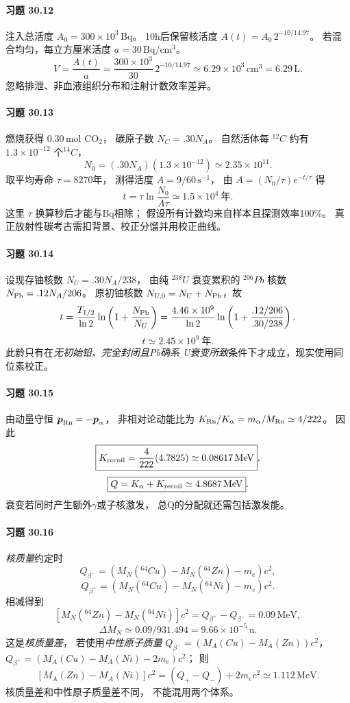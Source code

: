\paragraph{习题 30.12}
注入总活度 \(A_0=300\times10^3\,\mathrm{Bq}\)。
10h后保留核活度 \(A(t)=A_0\,2^{-10/14.97}\)。
若混合均匀，每立方厘米活度
\(a=30\,\mathrm{Bq/cm^3}\)。
\[
\boxed{V=\frac{A(t)}a
=\frac{300\times10^3}{30}\,2^{-10/14.97}
\simeq6.29\times10^3\,\mathrm{cm^3}
=6.29\,\mathrm L}.
\]
忽略排泄、非血液组织分布和注射计数效率差异。

\paragraph{习题 30.13}
燃烧获得 \(0.30\,\mathrm{mol}\) CO$_2$，
碳原子数 \(N_C=.30N_A\)。
自然活体每 \({}^{12}C\) 约有
\(1.3\times10^{-12}\) 个\({}^{14}C\)，
\[
N_0=(.30N_A)(1.3\times10^{-12})
\simeq2.35\times10^{11}.
\]
取平均寿命 \(\tau=8270\)年，
测得活度 \(A=9/60\,\mathrm{s^{-1}}\)，
由 \(A=(N_0/\tau)e^{-t/\tau}\) 得
\[
\boxed{t=\tau\ln\frac{N_0}{A\tau}
\simeq1.5\times10^4\ \text{年}}.
\]
这里 \(\tau\) 换算秒后才能与Bq相除；
假设所有计数均来自样本且探测效率100\%。
真正放射性碳考古需扣背景、校正分馏并用校正曲线。

\paragraph{习题 30.14}
设现存铀核数 \(N_U=.30N_A/238\)，
由纯 \({}^{238}U\) 衰变累积的
\({}^{206}Pb\) 核数
\(N_{\rm Pb}=.12N_A/206\)。
原初铀核数
\(N_{U,0}=N_U+N_{\rm Pb}\)，故
\[
t=\frac{T_{1/2}}{\ln2}
\ln\left(1+\frac{N_{\rm Pb}}{N_U}\right)
=\frac{4.46\times10^9}{\ln2}
\ln\left(1+\frac{.12/206}{.30/238}\right).
\]
\[
\boxed{t\simeq2.45\times10^9\ \text{年}}.
\]
此龄只有在\emph{无初始铅、完全封闭且Pb确系
U衰变所致}条件下才成立，现实使用同位素校正。

\paragraph{习题 30.15}
由动量守恒 \(\boldsymbol p_{\rm Rn}
=-\boldsymbol p_\alpha\)，
非相对论动能比为
\(K_{\rm Rn}/K_\alpha=m_\alpha/M_{\rm Rn}
\simeq4/222\)。
因此
\[
\boxed{K_{\rm recoil}
=\frac4{222}(4.7825)\simeq0.08617\,\mathrm{MeV}},
\]
\[
\boxed{Q=K_\alpha+K_{\rm recoil}
\simeq4.8687\,\mathrm{MeV}}.
\]
衰变若同时产生额外\(\gamma\)或子核激发，
总Q的分配就还需包括激发能。

\paragraph{习题 30.16}
\emph{核质量}约定时
\[
Q_{\beta^-}=(M_N({}^{64}Cu)
-M_N({}^{64}Zn)-m_e)c^2,
\]
\[
Q_{\beta^+}=(M_N({}^{64}Cu)
-M_N({}^{64}Ni)-m_e)c^2.
\]
相减得到
\[
\boxed{[M_N({}^{64}Zn)-M_N({}^{64}Ni)]c^2
=Q_{\beta^+}-Q_{\beta^-}=0.09\,\mathrm{MeV}},
\]
\[
\boxed{\Delta M_N\simeq0.09/931.494
=9.66\times10^{-5}\,\mathrm u}.
\]
这是\emph{核质量差}，
若使用\emph{中性原子质量}
\(Q_{\beta^-}=(M_A(Cu)-M_A(Zn))c^2\)，
\(Q_{\beta^+}=(M_A(Cu)-M_A(Ni)-2m_e)c^2\)；
则
\[
[M_A(Zn)-M_A(Ni)]c^2
=(Q_+-Q_-)+2m_ec^2
\simeq1.112\,\mathrm{MeV}.
\]
核质量差和中性原子质量差不同，
不能混用两个体系。

